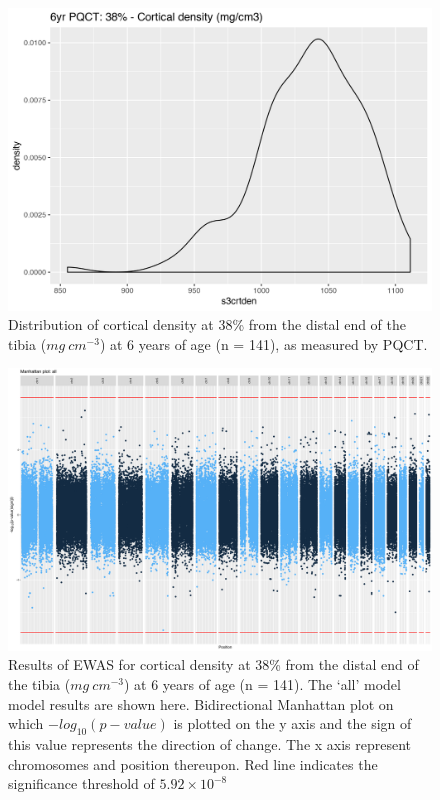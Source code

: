 \documentclass[
]{book}
\begin{document}
\begin{figure}

{\centering \includegraphics[width=0.8\linewidth]{figs/SWSs3crtden} 

}

\caption{Distribution of cortical density at 38\% from the distal end of the tibia (\(mg~cm^{-3}\)) at 6 years of age (n = 141), as measured by PQCT.}\label{fig:SWSs3crtden}
\end{figure}



\begin{figure}

{\centering \includegraphics[width=0.8\linewidth]{figs/SWSs3crtdenEPICewasManhattanAll} 

}

\caption{Results of EWAS for cortical density at 38\% from the distal end of the tibia (\(mg~cm^{-3}\)) at 6 years of age (n = 141). The `all' model model results are shown here. Bidirectional Manhattan plot on which \(-log_{10}(p-value)\) is plotted on the y axis and the sign of this value represents the direction of change. The x axis represent chromosomes and position thereupon. Red line indicates the significance threshold of \(5.92\times10^{-8}\)}\label{fig:SWSs3crtdenEPICewasManhattanSVA}
\end{figure}
\end{document}
